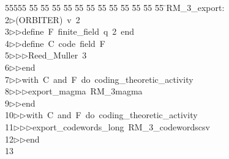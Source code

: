 %
%
\begin{tabbing}
55555 \= 55 \= 55 \= 55 \= 55 \= 55 \= 55 \= 55 \= 55 \= 55 \= 55 \= 55 \= 55 \= \>RM\_3\_export:\\[0pt]
2\>$\triangleright$\>(ORBITER)\ v\ 2\ \\[0pt]
3\>$\triangleright$\>$\triangleright$\>define\ F\ finite\_field\ q\ 2\ end\ \\[0pt]
4\>$\triangleright$\>$\triangleright$\>define\ C\ code\ field\ F\ \\[0pt]
5\>$\triangleright$\>$\triangleright$\>$\triangleright$\>Reed\_Muller\ 3\ \\[0pt]
6\>$\triangleright$\>$\triangleright$\>end\ \\[0pt]
7\>$\triangleright$\>$\triangleright$\>with\ C\ and\ F\ do\ coding\_theoretic\_activity\ \\[0pt]
8\>$\triangleright$\>$\triangleright$\>$\triangleright$\>export\_magma\ RM\_3magma\ \\[0pt]
9\>$\triangleright$\>$\triangleright$\>end\ \\[0pt]
10\>$\triangleright$\>$\triangleright$\>with\ C\ and\ F\ do\ coding\_theoretic\_activity\ \\[0pt]
11\>$\triangleright$\>$\triangleright$\>$\triangleright$\>export\_codewords\_long\ RM\_3\_codewordscsv\ \\[0pt]
12\>$\triangleright$\>$\triangleright$\>end\ \\[0pt]
13\>\end{tabbing}

